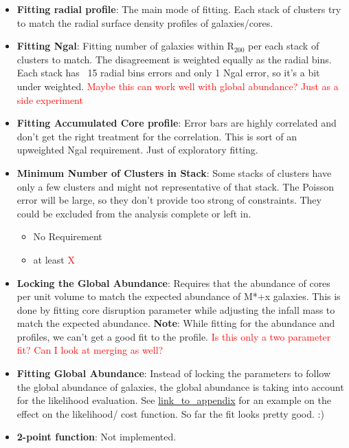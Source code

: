 \documentclass[twocolumn]{article}
\newcommand\mynotes[1]{\textcolor{red}{#1}}
\begin{document}
\begin{itemize}
  
\item \textbf{Fitting radial profile}: The main mode of fitting. Each
  stack of clusters try to match the radial surface density profiles
  of galaxies/cores.
  
\item \textbf{Fitting Ngal}: Fitting number of galaxies within
  R$_{200}$ per each stack of clusters to match. The disagreement is
  weighted equally as the radial bins. Each stack has ~15 radial bins
  errors and only 1 Ngal error, so it's a bit under
  weighted. \mynotes{Maybe this can work well with global abundance? Just as a
    side experiment}

  
\item \textbf{Fitting Accumulated Core profile}: Error bars are highly
  correlated and don't get the right treatment for the correlation. This is
  sort of an upweighted Ngal requirement. Just of exploratory fitting.
  

\item \textbf{Minimum Number of Clusters in Stack}: Some stacks of
  clusters have only a few clusters and might not representative of
  that stack. The Poisson error will be large, so they don't provide
  too strong of constraints. They could be excluded from the analysis
  complete or left in.
  \begin{itemize}
    \item No Requirement
    \item at least \mynotes{X}
  \end{itemize}


\item \textbf{Locking the Global Abundance}: Requires that the
  abundance of cores per unit volume to match the expected abundance
  of M*+x galaxies. This is done by fitting core disruption parameter
  while adjusting the infall mass to match the expected
  abundance. \textbf{Note}: While fitting for the abundance and
  profiles, we can't get a good fit to the profile. \mynotes{Is this
    only a two parameter fit? Can I look at merging as well?}


\item \textbf{Fitting Global Abundance}: Instead of locking the
  parameters to follow the global abundance of galaxies, the global
  abundance is taking into account for the likelihood evaluation. See
  \hyperref[sec:abundance example]{link\_to\_appendix}  for an example on the
  effect on the likelihood/ cost function. So far the fit looks pretty
  good. :)

  
\item \textbf{2-point function}: Not implemented. 


\end{itemize}
\end{document}
